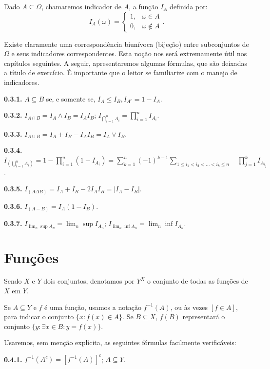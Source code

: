 \documentclass[
]{book}
\begin{document}
Dado \(A \subseteq \Omega\), chamaremos indicador de \(A\), a função \(I_A\) definida por: \[ I_A(\omega) = \begin{cases} 1, & \omega \in A \\ 0, & \omega \notin A \end{cases}. \]

Existe claramente uma correspondência biunívoca (bijeção) entre subconjuntos de \(\Omega\) e seus indicadores correspondentes.
Esta noção nos será extremamente útil nos capítulos seguintes.
A seguir, apresentaremos algumas fórmulas, que são deixadas a título de exercício.
É importante que o leitor se familiarize com o manejo de indicadores.

\textbf{0.3.1.} \(A \subseteq B\) se, e somente se, \(I_A \le I_B, I_{A^c} = 1 - I_A\).

\textbf{0.3.2.} \(I_{A \cap B} = I_A \wedge I_B = I_A I_B\); \(I_{\bigcap\limits_{i=1}^n A_i} = \prod\limits_{i=1}^n I_{A_i}\).

\textbf{0.3.3.} \(I_{A \cup B} = I_A + I_B - I_A I_B = I_A \vee I_B\).

\textbf{0.3.4.} \(I_{(\bigcup\limits_{i=1}^n A_i)} = 1 - \prod\limits_{i=1}^n (1-I_{A_i}) = \sum\limits_{k=1}^n (-1)^{k-1} \sum\limits_{1 \le i_1 < i_2 < \dots < i_k \le n} \quad \prod\limits_{j=1}^k I_{A_{i_j}}\).

\textbf{0.3.5.} \(I_{(A \Delta B)} = I_A + I_B - 2 I_A I_B = |I_A - I_B|\).

\textbf{0.3.6.} \(I_{(A-B)} = I_A(1 - I_B)\).

\textbf{0.3.7.} \(I_{\lim_n \sup A_n} = \lim_n \sup I_{A_n}\); \(I_{\lim_n \inf A_n} = \lim_n \inf I_{A_n}\).

\section{Funções}\label{cap04}

Sendo \(X\) e \(Y\) dois conjuntos, denotamos por \(Y^X\) o conjunto de todas as funções de \(X\) em \(Y\).

Se \(A \subseteq Y\) e \(f\) é uma função, usamos a notação \(f^{-1}(A)\), ou às vezes \([f \in A]\), para indicar o conjunto \(\{x: f(x) \in A\}\).
Se \(B \subseteq X\), \(f(B)\) representará o conjunto \(\{y: \exists x \in B: y = f(x)\}\).

Usaremos, sem menção explícita, as seguintes fórmulas facilmente verificáveis:

\textbf{0.4.1.} \(f^{-1}(A^c) = [f^{-1}(A)]^c\); \(A \subseteq Y\).
\end{document}
